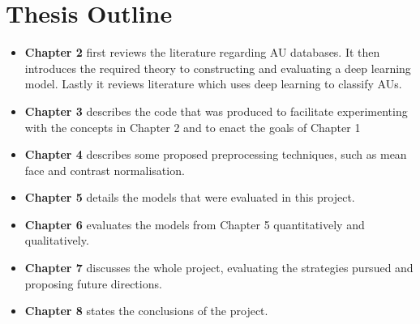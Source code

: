   \section{Thesis Outline}
    \begin{itemize}
      \item {\bf Chapter 2} first reviews the literature regarding AU databases. It then introduces the
            required theory to constructing and evaluating a deep learning model. Lastly it
            reviews literature which uses deep learning to classify AUs.
      \item {\bf Chapter 3} describes the code that was produced to facilitate experimenting with
            the concepts in Chapter 2 and to enact the goals of Chapter 1
      \item {\bf Chapter 4} describes some proposed preprocessing techniques, such as mean face
            and contrast normalisation.
      \item {\bf Chapter 5} details the models that were evaluated in this project.
      \item {\bf Chapter 6} evaluates the models from Chapter 5 quantitatively and qualitatively.
      \item {\bf Chapter 7} discusses the whole project, evaluating the strategies pursued and
            proposing future directions.
      \item {\bf Chapter 8} states the conclusions of the project.
  \end{itemize}
